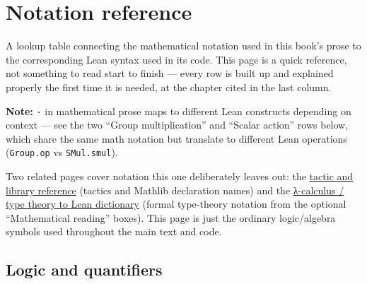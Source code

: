 \chapter*{Notation reference}
\setcounter{section}{0}\label{sec:root:notation-reference:1}

A lookup table connecting the mathematical notation used in this book's prose to the corresponding Lean syntax used in its code. This page is a quick reference, not something to read start to finish --- every row is built up and explained properly the first time it is needed, at the chapter cited in the last column.

\textbf{Note:} \texttt{·} in mathematical prose maps to different Lean constructs depending on context --- see the two ``Group multiplication'' and ``Scalar action'' rows below, which share the same math notation but translate to different Lean operations (\texttt{Group.op} vs \texttt{SMul.smul}).

Two related pages cover notation this one deliberately leaves out: the \hyperref[sec:root:tactic-and-library-reference:1]{tactic and library reference} (tactics and Mathlib declaration names) and the \hyperref[sec:root:lambda-calculus-dictionary:1]{λ-calculus / type theory to Lean dictionary} (formal type-theory notation from the optional ``Mathematical reading'' boxes). This page is just the ordinary logic/algebra symbols used throughout the main text and code.

\section*{Logic and quantifiers}
\label{sec:root:notation-reference:2}

